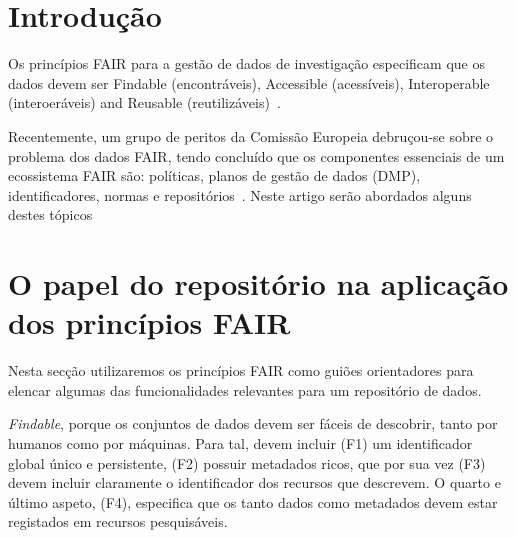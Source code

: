 \documentclass[sigconf,nonacm]{acmart}
\begin{document}

\maketitle

\section{Introdução}

Os princípios FAIR para a gestão de dados de investigação especificam que os dados devem ser Findable (encontráveis), Accessible (acessíveis), Interoperable (interoeráveis) and Reusable (reutilizáveis)~\cite{wilkinson2016fair}. 

Recentemente, um grupo de peritos da Comissão Europeia debruçou-se sobre o problema dos dados FAIR, tendo concluído que os componentes essenciais de um ecossistema FAIR são: políticas, planos de gestão de dados (DMP), identificadores, normas e repositórios~\cite{hodson2018turning}. Neste artigo serão abordados alguns destes tópicos

\section{O papel do repositório na aplicação dos princípios FAIR}


Nesta secção utilizaremos os princípios FAIR como guiões orientadores para elencar algumas das funcionalidades relevantes para um repositório de dados. 

\emph{Findable}, porque os conjuntos de dados devem ser fáceis de descobrir, tanto por humanos como por máquinas. Para tal, devem incluir (F1) um identificador global único e persistente, (F2) possuir metadados ricos, que por sua vez (F3) devem incluir claramente o identificador dos recursos que descrevem. O quarto e último aspeto, (F4), especifica que os tanto dados como metadados devem estar registados em recursos pesquisáveis. 
\end{document}
